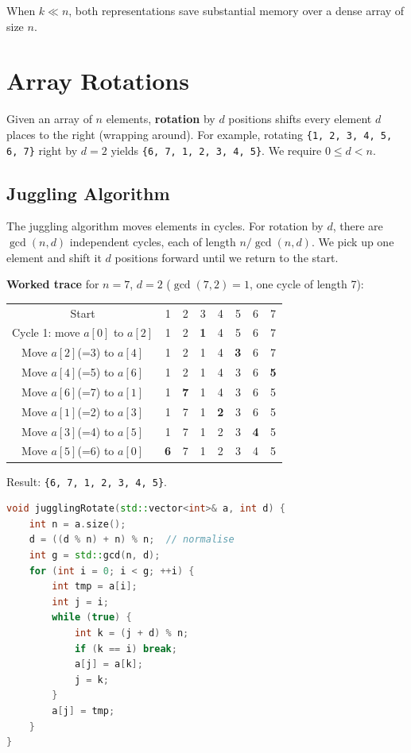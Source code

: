When $k \ll n$, both representations save substantial memory over a dense array of size $n$.

\section{Array Rotations}\label{sec:array-rotations}

Given an array of $n$ elements, \textbf{rotation} by $d$ positions shifts every element $d$ places to the right (wrapping around). For example, rotating \texttt{\{1, 2, 3, 4, 5, 6, 7\}} right by $d = 2$ yields \texttt{\{6, 7, 1, 2, 3, 4, 5\}}. We require $0 \le d < n$.

\subsection{Juggling Algorithm}

The juggling algorithm moves elements in cycles. For rotation by $d$, there are $\gcd(n, d)$ independent cycles, each of length $n / \gcd(n, d)$. We pick up one element and shift it $d$ positions forward until we return to the start.

\textbf{Worked trace} for $n = 7$, $d = 2$ ($\gcd(7,2) = 1$, one cycle of length 7):

\begin{center}
\begin{tabular}{c|ccccccc}
Start  & 1 & 2 & 3 & 4 & 5 & 6 & 7 \\
Cycle 1: move $a[0]$ to $a[2]$ & 1 & 2 & \textbf{1} & 4 & 5 & 6 & 7 \\
Move $a[2]$(=3) to $a[4]$ & 1 & 2 & 1 & 4 & \textbf{3} & 6 & 7 \\
Move $a[4]$(=5) to $a[6]$ & 1 & 2 & 1 & 4 & 3 & 6 & \textbf{5} \\
Move $a[6]$(=7) to $a[1]$ & 1 & \textbf{7} & 1 & 4 & 3 & 6 & 5 \\
Move $a[1]$(=2) to $a[3]$ & 1 & 7 & 1 & \textbf{2} & 3 & 6 & 5 \\
Move $a[3]$(=4) to $a[5]$ & 1 & 7 & 1 & 2 & 3 & \textbf{4} & 5 \\
Move $a[5]$(=6) to $a[0]$ & \textbf{6} & 7 & 1 & 2 & 3 & 4 & 5 \\
\end{tabular}
\end{center}

Result: \texttt{\{6, 7, 1, 2, 3, 4, 5\}}.

\begin{lstlisting}[language=C++]
void jugglingRotate(std::vector<int>& a, int d) {
    int n = a.size();
    d = ((d % n) + n) % n;  // normalise
    int g = std::gcd(n, d);
    for (int i = 0; i < g; ++i) {
        int tmp = a[i];
        int j = i;
        while (true) {
            int k = (j + d) % n;
            if (k == i) break;
            a[j] = a[k];
            j = k;
        }
        a[j] = tmp;
    }
}
\end{lstlisting}

